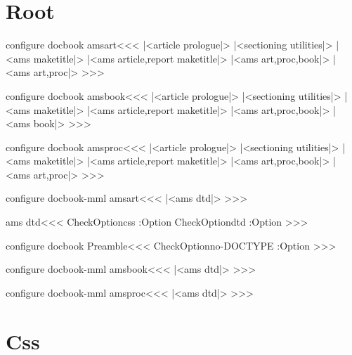 \section{Root}


\<configure docbook amsart\><<< 
|<article prologue|>
|<sectioning utilities|>
|<ams maketitle|>
|<ams article,report maketitle|>
|<ams art,proc,book|>
|<ams art,proc|>
>>>

\<configure docbook amsbook\><<< 
|<article prologue|>
|<sectioning utilities|>
|<ams maketitle|>
|<ams article,report maketitle|>
|<ams art,proc,book|>
|<ams book|>
>>>

\<configure docbook amsproc\><<< 
|<article prologue|>
|<sectioning utilities|>
|<ams maketitle|>
|<ams article,report maketitle|>
|<ams art,proc,book|>
|<ams art,proc|>
>>>

\<configure docbook-mml amsart\><<< 
|<ams dtd|>
>>>

\<ams dtd\><<<
\:CheckOption{css} \if:Option
   \:CheckOption{dtd} \if:Option
         {}
        {}
        {}
   \else
         {}
      {}
        {}
   \fi
\else
      {}
     {}
\fi
>>>



\<configure docbook Preamble\><<<  
\:CheckOption{no-DOCTYPE} \if:Option
\fi
>>>



\<configure docbook-mml amsbook\><<< 
|<ams dtd|>
>>>

\<configure docbook-mml amsproc\><<< 
|<ams dtd|>
>>>



\section{Css}

